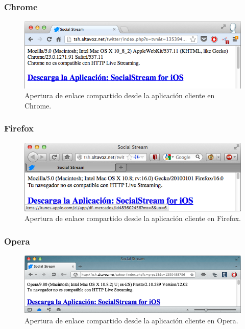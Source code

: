     \subsubsection{Chrome}
  \begin{figure}[H]
	\centering
	\includegraphics[scale=0.6]{imgs/uagent-chrome.png} 
	\caption{Apertura de enlace compartido desde la aplicación cliente en Chrome.}
	\label{fig:uagent-chrome}
\end{figure}  
    \subsubsection{Firefox}
  \begin{figure}[H]
	\centering
	\includegraphics[scale=0.6]{imgs/uagent-firefox.png} 
	\caption{Apertura de enlace compartido desde la aplicación cliente en Firefox.}
	\label{fig:uagent-firefox}
\end{figure}  
    \subsubsection{Opera}
  \begin{figure}[H]
	\centering
	\includegraphics[scale=0.55]{imgs/uagent-opera.png} 
	\caption{Apertura de enlace compartido desde la aplicación cliente en Opera.}
	\label{fig:uagent-opera}
\end{figure}  
